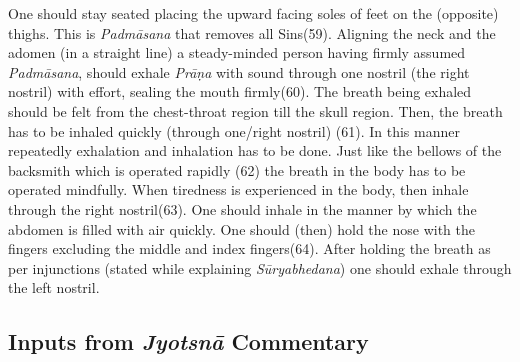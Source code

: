 One should stay seated placing the upward facing soles of feet on the (opposite) thighs. This is \textit{Padmāsana} that removes all Sins(59). Aligning the neck and the adomen (in a straight line) a steady-minded person having firmly assumed \textit{Padmāsana}, should exhale \textit{Prāṇa} with sound through one nostril (the right nostril) with effort, sealing the mouth firmly(60). The breath being exhaled should be felt from the chest-throat region till the skull region. Then, the breath has to be inhaled quickly (through one/right nostril) (61). In this manner repeatedly exhalation and inhalation has to be done. Just like the bellows of the backsmith which is operated rapidly (62) the breath in the body has to be operated mindfully. When tiredness is experienced in the body, then inhale through the right nostril(63). One should inhale in the manner by which the abdomen is filled with air quickly. One should (then) hold the nose with the fingers excluding the middle and index fingers(64). After holding the breath as per injunctions (stated while explaining \textit{Sūryabhedana}) one should exhale through the left nostril.

\subsection*{Inputs from \textit{Jyotsnā} Commentary}


